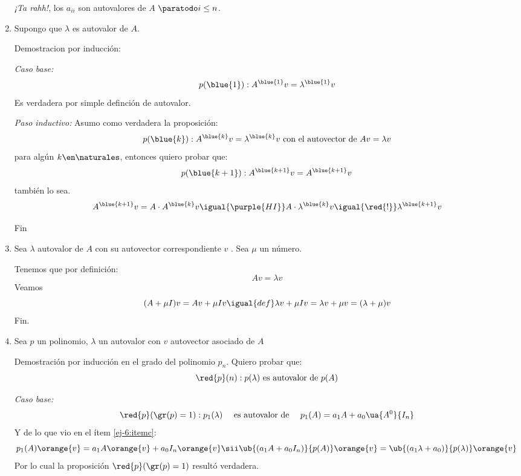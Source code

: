 \begin{enumerate}[label=(\alph*)]
        \textit{¡Ta rahh!}, los $a_{ii}$ son autovalores de $A$ $\paratodo i \leq n$.

  \item\label{ej-6:itemb} Supongo que $\lambda$ es autovalor de $A$.

        Demostracion por inducción:

        \textit{Caso base:}
        $$
          p(\blue{1}) : A^{\blue{1}}v = \lambda^{\blue{1}} v
        $$
        Es verdadera por simple definción de autovalor.

        \textit{Paso inductivo:}
        Asumo como verdadera la proposición:
        $$
          p(\blue{k}) : A^{\blue{k}}v = \lambda^{\blue{k}}v \text{ con el autovector de }  Av = \lambda v
        $$
        para algún $k \en \naturales$, entonces quiero probar que:
        $$
          p(\blue{k+1}) : A^{\blue{k + 1}}v = A^{\blue{k+1}}v
        $$
        también lo sea.
        $$
          A^{\blue{k + 1}}v = A \cdot A^{\blue{k}}v
          \igual{\purple{HI}}
          A \cdot \lambda^{\blue{k}} v
          \igual{\red{!}}
          \lambda^{\blue{k+1}} v
        $$

        Fin

  \item\label{ej-6:itemc}
        Sea $\lambda$ autovalor de $A$ con su autovector correspondiente $v$ . Sea $\mu$ un número.

        Tenemos que por definición:
        $$
          Av = \lambda v
        $$
        Veamos
        $$
          (A + \mu I)v = Av + \mu I v
          \igual{def}
          \lambda v + \mu Iv = \lambda v + \mu v = (\lambda + \mu) v
        $$
        Fin.

  \item
        Sea $p$ un polinomio, $\lambda$ un autovalor con $v$ autovector asociado de $A$

        Demostración por inducción en el grado del polinomio $p_n$. Quiero probar que:
        $$
          \red{p}(n) : p(\lambda) \text{ es autovalor de } p(A)
        $$

        \textit{Caso base:}
        $$
          \red{p}(\gr(p) = 1) : p_1(\lambda) \quad \text{ es autovalor de } \quad p_1(A) = a_1 A + a_0 \ua{A^0}{I_n}
        $$
        Y de lo que vio en el ítem \ref{ej-6:itemc}:
        $$
          p_1(A)\orange{v} = a_1A\orange{v} + a_0I_n \orange{v}
          \sii
          \ub{(a_1A + a_0I_n)}{p(A)} \orange{v} = \ub{(a_1\lambda + a_0)}{p(\lambda)}\orange{v}
        $$
        Por lo cual la proposición $\red{p}(\gr(p) = 1)$ resultó verdadera.


\end{enumerate}
